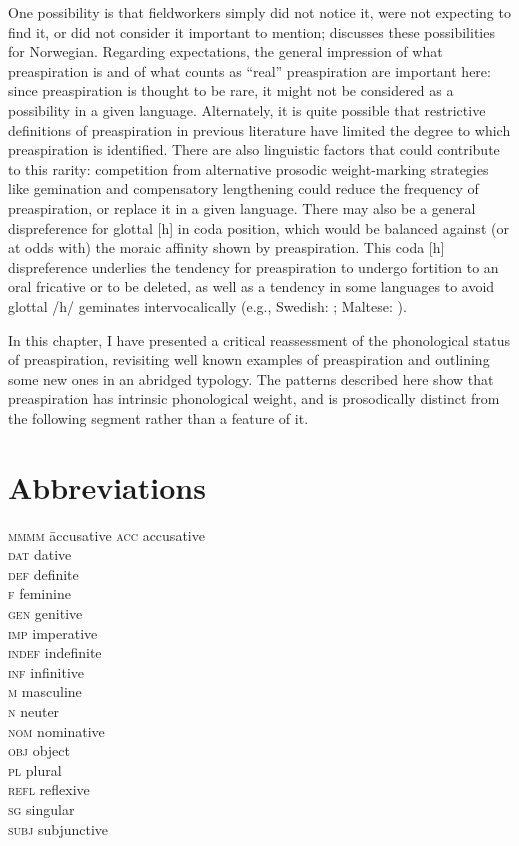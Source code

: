 \documentclass[output=paper,colorlinks,citecolor=brown]{langscibook}
\begin{document}
One possibility is that fieldworkers simply did not notice it, were not expecting to find it, or did not consider it important to mention; \citet{iosad2018} discusses these possibilities for Norwegian. Regarding expectations, the general impression of what preaspiration is and of what counts as ``real'' preaspiration are important here: since preaspiration is thought to be rare, it might not be considered as a possibility in a given language. Alternately, it is quite possible that restrictive definitions of preaspiration in previous literature have limited the degree to which preaspiration is identified. There are also linguistic factors that could contribute to this rarity: competition from alternative prosodic weight-marking strategies like gemination and compensatory lengthening could reduce the frequency of preaspiration, or replace it in a given language. There may also be a general dispreference for glottal [h] in coda position, which would be balanced against (or at odds with) the moraic affinity shown by preaspiration. This coda [h] dispreference underlies the tendency for preaspiration to undergo fortition to an oral fricative or to be deleted, as well as a tendency in some languages to avoid glottal /h/ geminates intervocalically (e.g., Swedish: {\citealp[45]{riad2014}}; Maltese: \citealp{mitterer2018}).

In this chapter, I have presented a critical reassessment of the phonological status of preaspiration, revisiting well known examples of preaspiration and outlining some new ones in an abridged typology. The patterns described here show that preaspiration has intrinsic phonological weight, and is prosodically distinct from the following segment rather than a feature of it.



\section*{Abbreviations}
\begin{multicols}{3}
\begin{tabbing}
\textsc{mmmm} \= accusative \kill
\textsc{acc} \> accusative \\
\textsc{dat} \> dative \\
\textsc{def} \> definite \\
\textsc{f} \> feminine \\
\textsc{gen} \> genitive \\
\textsc{imp} \> imperative \\
\textsc{indef} \> indefinite \\
\textsc{inf} \> infinitive \\
\textsc{m} \> masculine \\
\textsc{n} \> neuter \\
\textsc{nom} \> nominative \\
\textsc{obj} \> object \\
\textsc{pl} \> plural \\
\textsc{refl} \> reflexive \\
\textsc{sg} \> singular \\
\textsc{subj} \> subjunctive
\end{tabbing}
\end{multicols}
\end{document}
